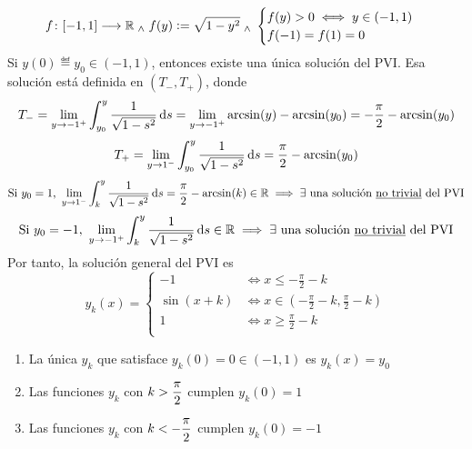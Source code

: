 
\begin{ejem}[$y'=\sqrt{1-y^2}$]
	\[f \colon [-1, 1] \longrightarrow \mathbb{R} \; _{\wedge} \; f(y)\vcentcolon=\sqrt{1-y^2} \; _{\wedge} \; \begin{cases}
			f(y)>0 \iff y\in (-1, 1) \\
			f(-1)=f(1)=0
		\end{cases}\]
	Si $y(0)\eqdef y_0 \in (-1, 1)$, entonces existe una única solución del PVI. Esa solución está definida en $(T_-, T_+)$, donde
	\[T_-=\lim_{y\to -1^+}\int_{y_0}^{y} \frac{1}{\sqrt{1-s^2}}\odif{s}=\lim_{y\to -1^+}\arcsin(y)-\arcsin(y_0)=-\frac{\pi}{2}-\arcsin(y_0)\]
	\[T_+=\lim_{y\to 1^-}\int_{y_0}^{y} \frac{1}{\sqrt{1-s^2}}\odif{s}=\frac{\pi}{2}-\arcsin(y_0)\]
	\[\tex{Si $y_0=1$, }\lim_{y\to 1^-} \int_{k}^{y} \frac{1}{\sqrt{1-s^2}} \odif{s} = \frac{\pi}{2} -\arcsin(k) \in \R \implies \exists \tex{ una solución \underline{no trivial} del PVI}\]
	\[\tex{Si $y_0=-1$, }\lim_{y\to -1^+} \int_{k}^{y} \frac{1}{\sqrt{1-s^2}} \odif{s}  \in \R \implies \exists \tex{ una solución \underline{no trivial} del PVI}\]
	Por tanto, la solución general del PVI es
	\[y_k(x)=\begin{cases}
			-1        & \iff x\leq -\frac{\pi}{2}-k                               \\
			\sin(x+k) & \iff x \in \left(-\frac{\pi}{2}-k, \frac{\pi}{2}-k\right) \\
			1         & \iff x\geq \frac{\pi}{2}-k                                \\
		\end{cases}\]
	\begin{enumerate}
		\item La única $y_k$ que satisface $y_k(0)=0 \in (-1, 1)$ es $y_k(x)=y_0$
		\item Las funciones $y_k$ con $\displaystyle k > \frac{\pi}{2}$ cumplen $y_k(0)=1$
		\item Las funciones $y_k$ con $\displaystyle k < -\frac{\pi}{2}$ cumplen $y_k(0)=-1$
	\end{enumerate}
\end{ejem}

